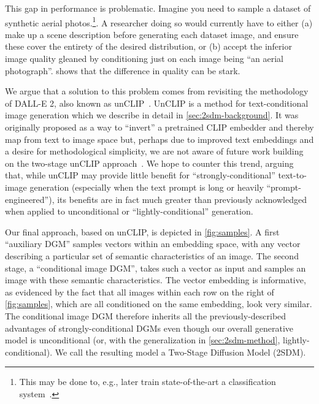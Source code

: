 


This gap in performance is problematic. Imagine you need to sample a dataset of synthetic aerial photos.\footnote{ This may be done to, e.g., later train state-of-the-art a classification system~\citep{azizi2023synthetic}.}. A researcher doing so would currently have to either (a) make up a scene description before generating each dataset image, and ensure these cover the entirety of the desired distribution, or (b) accept the inferior image quality gleaned by conditioning just on each image being ``an aerial photograph''.   shows that the difference in quality can be stark.

We argue that a solution to this problem comes from revisiting the methodology of DALL-E 2, also known as unCLIP~\citep{ramesh2022hierarchical}. UnCLIP is a method for text-conditional image generation which we describe in detail in \cref{sec:2sdm-background}. It was originally proposed as a way to ``invert'' a pretrained CLIP embedder and thereby map from text to image space but, perhaps due to improved text embeddings and a desire for methodological simplicity, we are not aware of future work building on the two-stage unCLIP approach~\citep{rombach2022high,chang2023muse,hoogeboom2023simple}. We hope to counter this trend, arguing that, while unCLIP may provide little benefit for ``strongly-conditional'' text-to-image generation (especially when the text prompt is long or heavily ``prompt-engineered''), its benefits are in fact much greater than previously acknowledged when applied to unconditional or ``lightly-conditional'' generation.

Our final approach, based on unCLIP, is depicted in \cref{fig:samples}. A first ``auxiliary DGM'' samples vectors within an embedding space, with any vector describing a particular set of semantic characteristics of an image. The second stage, a ``conditional image DGM'', takes such a vector as input and samples an image with these semantic characteristics. The vector embedding is informative, as evidenced by the fact that all images within each row on the right of \cref{fig:samples}, which are all conditioned on the same embedding, look very similar. The conditional image DGM therefore inherits all the previously-described advantages of strongly-conditional DGMs even though our overall generative model is unconditional (or, with the generalization in \cref{sec:2sdm-method}, lightly-conditional). We call the resulting model a Two-Stage Diffusion Model (2SDM). 

